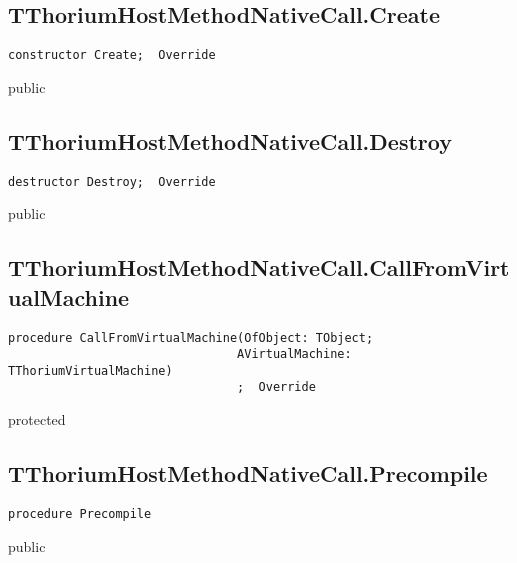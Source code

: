 \subsection{TThoriumHostMethodNativeCall.Create}
\label{thoriumcore:thorium:tthoriumhostmethodnativecall:create}
\begin{FPCList}
\Synopsis
\Declaration 

\begin{verbatim}
constructor Create;  Override
\end{verbatim}
\Visibility
public
\Description
\Errors
\end{FPCList}
\subsection{TThoriumHostMethodNativeCall.Destroy}
\label{thoriumcore:thorium:tthoriumhostmethodnativecall:destroy}
\begin{FPCList}
\Synopsis
\Declaration 

\begin{verbatim}
destructor Destroy;  Override
\end{verbatim}
\Visibility
public
\Description
\Errors
\end{FPCList}
\subsection{TThoriumHostMethodNativeCall.CallFromVirtualMachine}
\label{thoriumcore:thorium:tthoriumhostmethodnativecall:callfromvirtualmachine}
\begin{FPCList}
\Synopsis
\Declaration 

\begin{verbatim}
procedure CallFromVirtualMachine(OfObject: TObject;
                                AVirtualMachine: TThoriumVirtualMachine)
                                ;  Override
\end{verbatim}
\Visibility
protected
\Description
\Errors
\end{FPCList}
\subsection{TThoriumHostMethodNativeCall.Precompile}
\label{thoriumcore:thorium:tthoriumhostmethodnativecall:precompile}
\begin{FPCList}
\Synopsis
\Declaration 

\begin{verbatim}
procedure Precompile
\end{verbatim}
\Visibility
public
\Description
\Errors
\end{FPCList}
